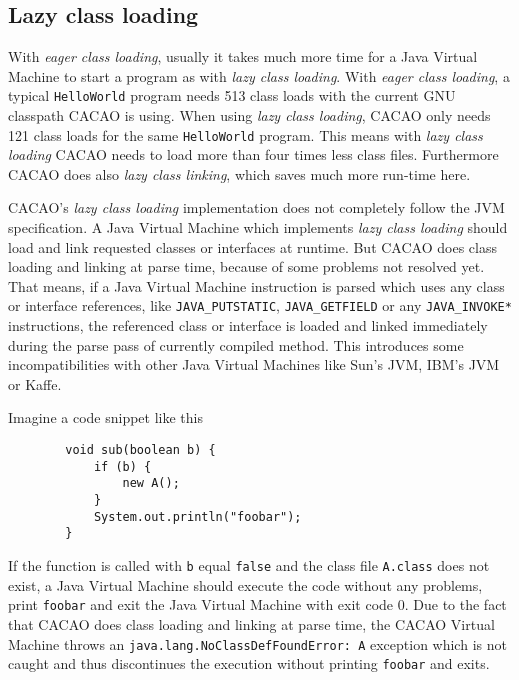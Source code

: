 \subsection{Lazy class loading}
\label{sectionlazyclassloading}

With \textit{eager class loading}, usually it takes much more time for
a Java Virtual Machine to start a program as with \textit{lazy class
loading}. With \textit{eager class loading}, a typical
\texttt{HelloWorld} program needs 513 class loads with the current GNU
classpath CACAO is using. When using \textit{lazy class loading},
CACAO only needs 121 class loads for the same \texttt{HelloWorld}
program. This means with \textit{lazy class loading} CACAO needs to
load more than four times less class files. Furthermore CACAO does
also \textit{lazy class linking}, which saves much more run-time here.

CACAO's \textit{lazy class loading} implementation does not completely
follow the JVM specification. A Java Virtual Machine which implements
\textit{lazy class loading} should load and link requested classes or
interfaces at runtime. But CACAO does class loading and linking at
parse time, because of some problems not resolved yet. That means, if
a Java Virtual Machine instruction is parsed which uses any class or
interface references, like \texttt{JAVA\_PUTSTATIC},
\texttt{JAVA\_GETFIELD} or any \texttt{JAVA\_INVOKE*} instructions,
the referenced class or interface is loaded and linked immediately
during the parse pass of currently compiled method. This introduces
some incompatibilities with other Java Virtual Machines like Sun's
JVM, IBM's JVM or Kaffe.

Imagine a code snippet like this

\begin{verbatim}
        void sub(boolean b) {
            if (b) {
                new A();
            }
            System.out.println("foobar");
        }
\end{verbatim}

If the function is called with \texttt{b} equal \texttt{false} and the
class file \texttt{A.class} does not exist, a Java Virtual Machine
should execute the code without any problems, print \texttt{foobar}
and exit the Java Virtual Machine with exit code 0. Due to the fact
that CACAO does class loading and linking at parse time, the CACAO
Virtual Machine throws an \texttt{java.lang.NoClassDefFoundError:~A}
exception which is not caught and thus discontinues the execution
without printing \texttt{foobar} and exits.

